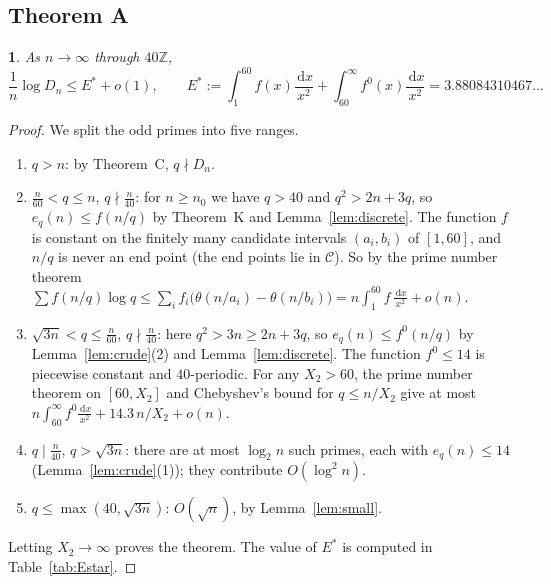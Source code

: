 \documentclass{amsart}
\newcommand{\thisthmname}{}
\newtheorem*{genericthm}{\thisthmname}
\newenvironment{namedthm}[1]{\renewcommand{\thisthmname}{#1}\begin{genericthm}}{\end{genericthm}}
\theoremstyle{definition}
\theoremstyle{remark}
\numberwithin{equation}{section}
\newcommand{\Z}{\mathbb{Z}}
\newcommand{\dd}{\,\mathrm{d}}
\begin{document}
\subsection{Theorem A}\label{ss:A}

\begin{namedthm}{Theorem A}
As $n\to\infty$ through $40\Z$,
\[
  \frac1n\log D_n\le E^*+o(1),\qquad
  E^*:=\int_1^{60}f(x)\frac{\dd x}{x^2}+\int_{60}^\infty f^0(x)\frac{\dd x}{x^2}=3.88084310467\ldots
\]
\end{namedthm}

\begin{proof}
We split the odd primes into five ranges.
\begin{enumerate}
\item $q>n$: by Theorem~C, $q\nmid D_n$.
\item $\frac n{60}<q\le n$, $q\nmid\frac n{40}$: for $n\ge n_0$ we have $q>40$
  and $q^2>2n+3q$, so $e_q(n)\le f(n/q)$ by Theorem~K and
  Lemma~\ref{lem:discrete}. The function $f$ is constant on the finitely many
  candidate intervals $(a_i,b_i)$ of $[1,60]$, and $n/q$ is never an end
  point (the end points lie in $\mathcal C$). So by the prime number theorem
  $\sum f(n/q)\log q\le\sum_if_i\bigl(\theta(n/a_i)-\theta(n/b_i)\bigr)
  =n\int_1^{60}f\,\frac{\dd x}{x^2}+o(n)$.
\item $\sqrt{3n}<q\le\frac n{60}$, $q\nmid\frac n{40}$: here
  $q^2>3n\ge2n+3q$, so $e_q(n)\le f^0(n/q)$ by Lemma~\ref{lem:crude}(2)
  and Lemma~\ref{lem:discrete}. The function $f^0\le14$ is piecewise constant
  and $40$-periodic. For any $X_2>60$, the prime number theorem on
  $[60,X_2]$ and Chebyshev's bound for $q\le n/X_2$ give at most
  $n\int_{60}^\infty f^0\frac{\dd x}{x^2}+14.3\,n/X_2+o(n)$.
\item $q\mid\frac n{40}$, $q>\sqrt{3n}$: there are at most $\log_2n$ such
  primes, each with $e_q(n)\le14$ (Lemma~\ref{lem:crude}(1)); they contribute
  $O(\log^2n)$.
\item $q\le\max(40,\sqrt{3n})$: $O(\sqrt n)$, by Lemma~\ref{lem:small}.
\end{enumerate}
Letting $X_2\to\infty$ proves the theorem. The value of $E^*$ is computed in
Table~\ref{tab:Estar}.
\end{proof}
\end{document}
